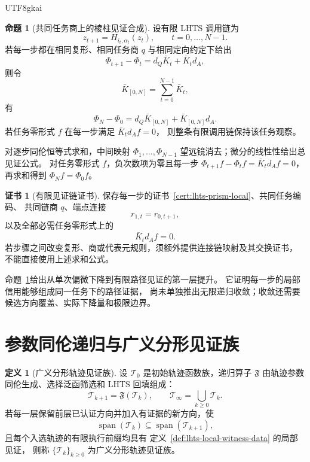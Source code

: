 \documentclass[12pt]{report}
\makeatletter
\theoremstyle{definition}
\newtheorem{definition}{定义}[chapter]
\newtheorem{proposition}{命题}[chapter]
\newtheorem{Certificate}{证书}[chapter]
\renewenvironment{proof}[1][\proofname]{\par
  \pushQED{\qed}\normalfont
  \topsep6\p@\@plus6\p@\relax
  \trivlist
  \item[\hskip\labelsep\normalfont #1\@addpunct{.}]\ignorespaces
}{
  \popQED\endtrivlist\@endpefalse
}
\makeatother
\begin{document}
\begin{CJK*}{UTF8}{gkai}
\begin{proposition}[共同任务商上的棱柱见证合成]
\label{prop:finite-prism-witness-composition}
设有限 LHTS 调用链为
\[
z_{t+1}=H_{i_t,\alpha_t}(z_t),
\qquad t=0,\ldots,N-1.
\]
若每一步都在相同复形、相同任务商 \(q\) 与相同定向约定下给出
\[
\Phi_{t+1}-\Phi_t
=d_Q\bar K_t+\bar K_td_A,
\]
则令
\[
\bar K_{[0,N]}=\sum_{t=0}^{N-1}\bar K_t,
\]
有
\[
\boxed{
\Phi_N-\Phi_0
=
d_Q\bar K_{[0,N]}+\bar K_{[0,N]}d_A.}
\]
若任务零形式 \(f\) 在每一步满足 \(\bar K_td_Af=0\)，
则整条有限调用链保持该任务观察。
\end{proposition}

\begin{proof}
对逐步同伦恒等式求和，中间映射
\(\Phi_1,\ldots,\Phi_{N-1}\) 望远镜消去；微分的线性性给出总见证公式。
对任务零形式 \(f\)，负次数项为零且每一步
\(\Phi_{t+1}f-\Phi_tf=\bar K_td_Af=0\)，
再求和得到 \(\Phi_Nf=\Phi_0f\)。
\end{proof}

\begin{Certificate}[有限见证链证书]
\label{cert:finite-witness-chain}
保存每一步的证书~\ref{cert:lhts-prism-local}、共同任务编码、
共同链商 \(q\)、端点连接
\[
r_{1,t}=r_{0,t+1},
\]
以及全部必需任务零形式上的
\[
\bar K_td_Af=0.
\]
若步骤之间改变复形、商或代表元规则，须额外提供连接链映射及其交换证书，
不能直接使用上述求和公式。
\end{Certificate}

命题~\ref{prop:finite-prism-witness-composition}给出从单次偏微下降到有限路径见证的第一层提升。
它证明每一步的局部信用能够组成同一任务下的路径证据，
尚未单独推出无限递归收敛；收敛还需要候选方向覆盖、实际下降量和极限边界。

\section{参数同伦递归与广义分形见证族}

\begin{definition}[广义分形轨迹见证族]
\label{def:fractal-trajectory-witness-family}
设 \(\mathcal T_0\) 是初始轨迹函数族，递归算子
\(\mathfrak F\) 由轨迹参数同伦生成、选择泛函筛选和 LHTS 回填组成：
\[
\mathcal T_{k+1}=\mathfrak F(\mathcal T_k),
\qquad
\mathcal T_\infty=\bigcup_{k\ge0}\mathcal T_k.
\]
若每一层保留前层已认证方向并加入有证据的新方向，使
\[
\operatorname{span}(\mathcal T_k)
\subseteq
\operatorname{span}(\mathcal T_{k+1}),
\]
且每个入选轨迹的有限执行前缀均具有
定义~\ref{def:lhts-local-witness-data} 的局部见证，
则称 \(\{\mathcal T_k\}_{k\ge0}\) 为广义分形轨迹见证族。
\end{definition}


\end{CJK*}
\end{document}
